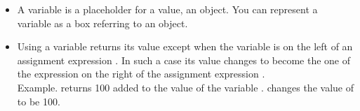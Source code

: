 \summa

\begin{itemize}
\item 
A variable is a placeholder for a value, an object. You can represent a variable as a box referring to an object. 

\item Using a variable returns its value except when the variable is on the left of an assignment expression \ct{:=}. In such a case its value changes to become the one of the expression on the right of the assignment expression \ct{:=}. \\
Example.  returns 100 added to the value of the variable .  changes the value of  to be 100.  
\end{itemize}

\ifx\wholebook\relax\else\fi
